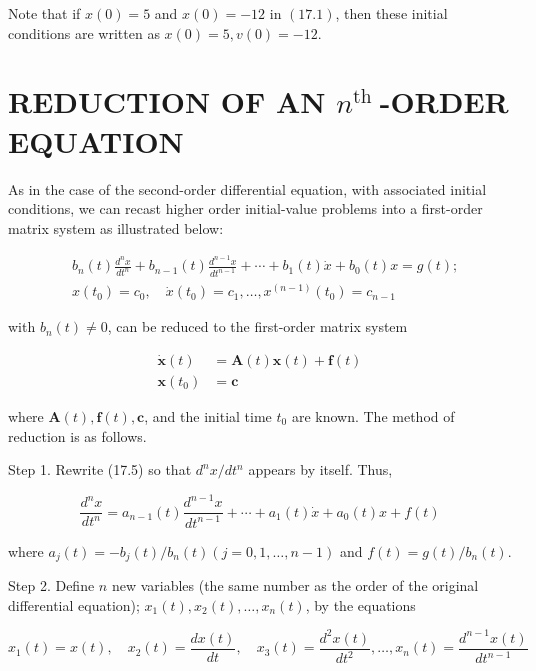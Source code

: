 \documentclass[10pt]{article}
\begin{document}
Note that if $x(0)=5$ and $x(0)=-12$ in $(17.1)$, then these initial conditions are written as $x(0)=5, v(0)=-12$.

\section*{REDUCTION OF AN $n^{\text {th }}$-ORDER EQUATION}
As in the case of the second-order differential equation, with associated initial conditions, we can recast higher order initial-value problems into a first-order matrix system as illustrated below:


\begin{align*}
& b_{n}(t) \frac{d^{n} x}{d t^{n}}+b_{n-1}(t) \frac{d^{n-1} x}{d t^{n-1}}+\cdots+b_{1}(t) \dot{x}+b_{0}(t) x=g(t) ;  \tag{17.5}\\
& x\left(t_{0}\right)=c_{0}, \quad \dot{x}\left(t_{0}\right)=c_{1}, \ldots, x^{(n-1)}\left(t_{0}\right)=c_{n-1} \tag{17.6}
\end{align*}


with $b_{n}(t) \neq 0$, can be reduced to the first-order matrix system


\begin{align*}
\dot{\mathbf{x}}(t) & =\mathbf{A}(t) \mathbf{x}(t)+\mathbf{f}(t) \\
\mathbf{x}\left(t_{0}\right) & =\mathbf{c} \tag{17.7}
\end{align*}


where $\mathbf{A}(t), \mathbf{f}(t), \mathbf{c}$, and the initial time $t_{0}$ are known. The method of reduction is as follows.

Step 1. Rewrite (17.5) so that $d^{n} x / d t^{n}$ appears by itself. Thus,


\begin{equation*}
\frac{d^{n} x}{d t^{n}}=a_{n-1}(t) \frac{d^{n-1} x}{d t^{n-1}}+\cdots+a_{1}(t) \dot{x}+a_{0}(t) x+f(t) \tag{17.8}
\end{equation*}


where $a_{j}(t)=-b_{j}(t) / b_{n}(t)(j=0,1, \ldots, n-1)$ and $f(t)=g(t) / b_{n}(t)$.

Step 2. Define $n$ new variables (the same number as the order of the original differential equation); $x_{1}(t), x_{2}(t), \ldots, x_{n}(t)$, by the equations


\begin{equation*}
x_{1}(t)=x(t), \quad x_{2}(t)=\frac{d x(t)}{d t}, \quad x_{3}(t)=\frac{d^{2} x(t)}{d t^{2}}, \ldots, x_{n}(t)=\frac{d^{n-1} x(t)}{d t^{n-1}} \tag{17.9}
\end{equation*}
\end{document}
